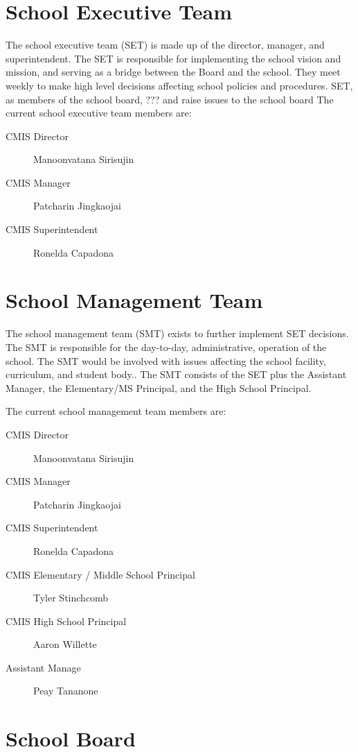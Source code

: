 \documentclass{report}
\begin{document}
\section{School Executive Team}

The school executive team (SET) is made up of the director, manager, and superintendent. The SET is responsible for implementing the school vision and mission, and serving as a bridge between the Board and the school.  They meet weekly to make high level decisions affecting school policies and procedures. SET, as members of the school board, ??? and raise issues to the school board 
 The current school executive team members are:
\begin{description}
\item[CMIS Director]Manoonvatana Sirisujin
\item[CMIS Manager]Patcharin Jingkaojai
\item[CMIS Superintendent]Ronelda Capadona
\end{description}

\section{School Management Team}
The school management team (SMT) exists to further implement SET decisions.  The SMT is responsible for the day-to-day, administrative, operation of the school.  The SMT would be involved with issues affecting the school facility, curriculum, and student body..  The SMT consists of the SET plus the Assistant Manager, the Elementary/MS Principal, and the High School Principal. 

The current school management team members are:
\begin{description}
\item[CMIS Director] Manoonvatana Sirisujin
\item[CMIS Manager] Patcharin Jingkaojai
\item[CMIS Superintendent]Ronelda Capadona
\item[CMIS Elementary / Middle School Principal] Tyler Stinchcomb
\item[CMIS High School Principal] Aaron Willette
\item[Assistant Manage] Peay Tananone
\end{description}

\section{School Board}
\end{document}
